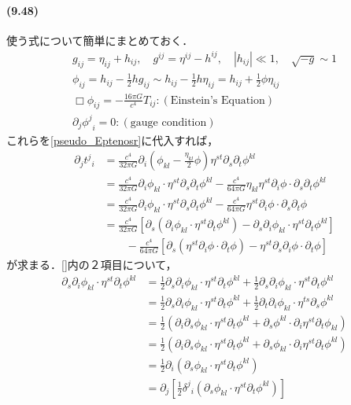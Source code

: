 \documentclass[a4paper]{ltjsreport}
\begin{document}
\paragraph{(9.48)}
使う式について簡単にまとめておく．
\begin{align*}
  g_{ij}=\eta_{ij} + h_{ij}, \quad{}g^{ij}=\eta^{ij} - h^{ij}, \quad{}|h_{ij}|\ll1, \quad{}\sqrt{ - g}\sim1\\
  \phi_{ij}=h_{ij} - \frac{1}{2}hg_{ij}\sim{}h_{ij} - \frac{1}{2}h\eta_{ij}=h_{ij} + \frac{1}{2}\phi\eta_{ij}\\
  \Box\phi_{ij}= - \frac{16\pi{G}}{c^4}T_{ij}\colon(\text{Einstein's Equation})\\
  \partial_j{\phi^j}_i=0\colon(\text{gauge condition})
\end{align*}
これらを\eqref{pseudo_Eptenosr}に代入すれば，
\begin{align*}
  \partial_j{t^j}_i &= \frac{c^4}{32\pi{G}}\partial_i\left(\phi_{kl} - \frac{\eta_{kl}}{2}\phi\right)\eta^{st}\partial_s\partial_t\phi^{kl}\\
  &= \frac{c^4}{32\pi{G}}\partial_i\phi_{kl}\cdot{}\eta^{st}\partial_s\partial_t\phi^{kl} - \frac{c^4}{64\pi{G}}\eta_{kl}\eta^{st}\partial_i\phi\cdot\partial_s\partial_t\phi^{kl}\\
  &= \frac{c^4}{32\pi{G}}\partial_i\phi_{kl}\cdot{}\eta^{st}\partial_s\partial_t\phi^{kl} - \frac{c^4}{64\pi{G}}\eta^{st}\partial_i\phi\cdot\partial_s\partial_t\phi\\
  &= \frac{c^4}{32\pi{G}}\left[\partial_s(\partial_i\phi_{kl}\cdot{}\eta^{st}\partial_t\phi^{kl}) - \partial_s\partial_i\phi_{kl}\cdot{}\eta^{st}\partial_t\phi^{kl}\right]\\
  &\qquad - \frac{c^4}{64\pi{G}}\left[\partial_s\left(\eta^{st}\partial_i\phi\cdot\partial_t\phi\right) - \eta^{st}\partial_s\partial_i\phi\cdot\partial_t\phi\right]
\end{align*}
が求まる．[]内の２項目について，
\begin{align*}
  \partial_s\partial_i\phi_{kl}\cdot{}\eta^{st}\partial_t\phi^{kl}
  &= \frac{1}{2}\partial_s\partial_i\phi_{kl}\cdot{}\eta^{st}\partial_t\phi^{kl} + \frac{1}{2}\partial_s\partial_i\phi_{kl}\cdot{}\eta^{st}\partial_t\phi^{kl}\\
  &= \frac{1}{2}\partial_s\partial_i\phi_{kl}\cdot{}\eta^{st}\partial_t\phi^{kl} + \frac{1}{2}\partial_t\partial_i\phi_{kl}\cdot{}\eta^{ts}\partial_s\phi^{kl}\\
  &= \frac{1}{2}\left(\partial_i\partial_s\phi_{kl}\cdot{}\eta^{st}\partial_t\phi^{kl} + \partial_s\phi^{kl}\cdot{}\partial_i\eta^{st}\partial_t\phi_{kl}\right)\\
  &= \frac{1}{2}\left(\partial_i\partial_s\phi_{kl}\cdot{}\eta^{st}\partial_t\phi^{kl} + \partial_s\phi_{kl}\cdot{}\partial_i\eta^{st}\partial_t\phi^{kl}\right)\\
  &= \frac{1}{2}\partial_i\left(\partial_s\phi_{kl}\cdot{}\eta^{st}\partial_t\phi^{kl}\right)\\
  &= \partial_j\left[\frac{1}{2}{\delta^j}_{i}\left(\partial_s\phi_{kl}\cdot{}\eta^{st}\partial_t\phi^{kl}\right)\right]
\end{align*}
\end{document}
